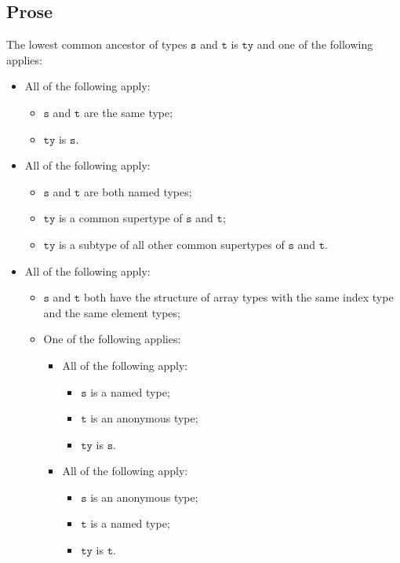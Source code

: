 \documentclass{book}
\newcommand\vt[0]{\texttt{t}}
\newcommand\vs[0]{\texttt{s}}
\newcommand\tty[0]{\texttt{ty}}
\begin{document}
\subsection{Prose}
The lowest common ancestor of types $\vs$ and $\vt$ is $\tty$ and one of the following applies:
  \begin{itemize}
  \item All of the following apply:
    \begin{itemize}
    \item $\vs$ and $\vt$ are the same type;
    \item $\tty$ is $\vs$.
    \end{itemize}

  \item All of the following apply:
    \begin{itemize}
    \item $\vs$ and $\vt$ are both named types;
    \item $\tty$ is a common supertype of $\vs$ and $\vt$;
    \item $\tty$ is a subtype of all other common supertypes of $\vs$ and $\vt$.
    \end{itemize}

  \item All of the following apply:
    \begin{itemize}
    \item $\vs$ and $\vt$ both have the structure of array types with the same index type
      and the same element types;

    \item One of the following applies:
      \begin{itemize}
      \item All of the following apply:
        \begin{itemize}
        \item $\vs$ is a named type;
        \item $\vt$ is an anonymous type;
        \item $\tty$ is $\vs$.
        \end{itemize}

      \item All of the following apply:
        \begin{itemize}
        \item $\vs$ is an anonymous type;
        \item $\vt$ is a named type;
        \item $\tty$ is $\vt$.
        \end{itemize}
      \end{itemize}
    \end{itemize}


\end{itemize}
\end{document}
